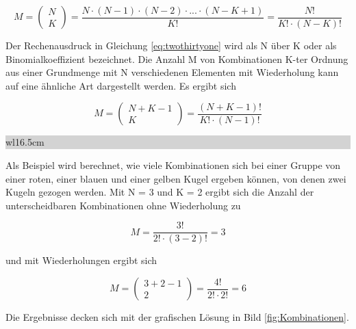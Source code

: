 \begin{equation}\label{eq:twothirtyone}
M=(\begin{array}{c} {N} \\ {K} \end{array})=\dfrac{N\cdot (N-1)\cdot (N-2)\cdot ...\cdot (N-K+1)}{K!} =\dfrac{N!}{K!\cdot (N-K)!}
\end{equation}

\noindent Der Rechenausdruck in Gleichung \eqref{eq:twothirtyone} wird als N \"{u}ber K oder als Binomialkoeffizient bezeichnet. Die Anzahl M von Kombinationen K-ter Ordnung aus einer Grundmenge mit N verschiedenen Elementen mit Wiederholung kann auf eine \"{a}hnliche Art dargestellt werden. Es ergibt sich\bigskip

\begin{equation}\label{eq:twothirtytwo}
M=(\begin{array}{c} {N+K-1} \\ {K} \end{array})=\dfrac{(N+K-1)!}{K!\cdot (N-1)!}
\end{equation}

\noindent
\colorbox{lightgray}{%
%
\renewcommand\arraystretch{0.6}%
\begin{tabular}{ wl{16.5cm} }
{\selectfont
{}}
\end{tabular}%
}\bigskip

\noindent Als Beispiel wird berechnet, wie viele Kombinationen sich bei einer Gruppe von einer roten, einer blauen und einer gelben Kugel ergeben k\"{o}nnen, von denen zwei Kugeln gezogen werden. Mit N = 3 und K = 2 ergibt sich die Anzahl der unterscheidbaren Kombinationen ohne Wiederholung zu 

\begin{equation}\label{eq:twothirtythree}
M=\dfrac{3!}{2!\cdot (3-2)!} =3
\end{equation}

\noindent und mit Wiederholungen ergibt sich 

\begin{equation}\label{eq:twothirtyfour}
M=(\begin{array}{c}{3+2-1}\\ {2} \end{array})=\dfrac{4!}{2!\cdot 2!} =6
\end{equation}

\noindent Die Ergebnisse decken sich mit der grafischen Lösung in Bild \ref{fig:Kombinationen}.


